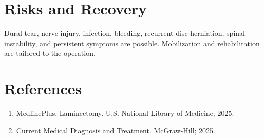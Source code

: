 \section*{Risks and Recovery}
Dural tear, nerve injury, infection, bleeding, recurrent disc herniation, spinal instability, and persistent symptoms are possible. Mobilization and rehabilitation are tailored to the operation.
\section*{References}
\begin{enumerate}\item MedlinePlus. Laminectomy. U.S. National Library of Medicine; 2025.\item Current Medical Diagnosis and Treatment. McGraw-Hill; 2025.\end{enumerate}
\clearpage
